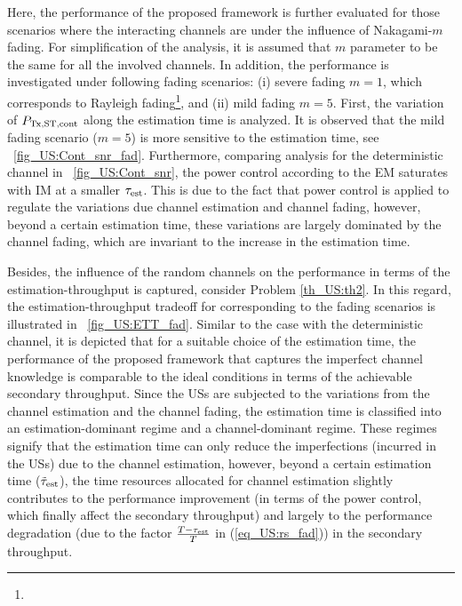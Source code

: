 Here, the performance of the proposed framework is further evaluated for those scenarios where the interacting channels are under the influence of Nakagami-$m$ fading. For simplification of the analysis, it is assumed that $m$ parameter to be the same for all the involved channels. In addition, the performance is investigated under following fading scenarios: (i) severe fading $m=1$, which corresponds to Rayleigh fading\footnote{}, and (ii) mild fading $m = 5$. First, the variation of $P_{\text{Tx,ST,cont}}$ along the estimation time is analyzed. It is observed that the mild fading scenario ($m = 5$) is more sensitive to the estimation time, see \figurename~\ref{fig_US:Cont_snr_fad}. Furthermore, comparing analysis for the deterministic channel in \figurename~\ref{fig_US:Cont_snr}, the power control according to the EM saturates with IM at a smaller $\tau_{\text{est}}$. This is due to the fact that power control is applied to regulate the variations due channel estimation and channel fading, however, beyond a certain estimation time, these variations are largely dominated by the channel fading, which are invariant to the increase in the estimation time. 

Besides, the influence of the random channels on the performance in terms of the estimation-throughput is captured, consider Problem \ref{th_US:th2}. In this regard, the estimation-throughput tradeoff for corresponding to the fading scenarios is illustrated in \figurename~\ref{fig_US:ETT_fad}. Similar to the case with the deterministic channel, it is depicted that for a suitable choice of the estimation time, the performance of the proposed framework that captures the imperfect channel knowledge is comparable to the ideal conditions in terms of the achievable secondary throughput. Since the USs are subjected to the variations from the channel estimation and the channel fading, the estimation time is classified into an estimation-dominant regime and a channel-dominant regime. These regimes signify that the estimation time can only reduce the imperfections (incurred in the USs) due to the channel estimation, however, beyond a certain estimation time ($\tilde{\tau}_{\text{est}}$), the time resources allocated for channel estimation slightly contributes to the performance improvement (in terms of the power control, which finally affect the secondary throughput) and largely to the performance degradation (due to the factor $\frac{T - \tau_{\text{est}}}{T}$ in (\ref{eq_US:rs_fad})) in the secondary throughput. 

